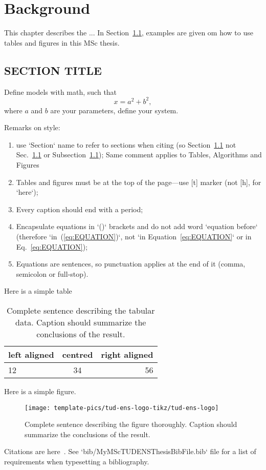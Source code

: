 \chapter{Background}
\label{chp:chapter_2}

This chapter describes the ... In Section~\ref{sec:SECTIONTITLE}, examples are given om how to use tables and figures in this MSc thesis.

\section{SECTION TITLE}
\label{sec:SECTIONTITLE}


Define models with math, such that
%
\begin{equation}
x = a^2 + b^2,
\label{eq:EQUATION}
\end{equation}
%
where $a$ and $b$ are your parameters, define your system.

Remarks on style:

\begin{enumerate}
	\item use `Section` name to refer to sections when citing (so Section~\ref{sec:SECTIONTITLE} not Sec.~\ref{sec:SECTIONTITLE} or Subsection~\ref{sec:SECTIONTITLE}); Same comment applies to Tables, Algorithms and Figures
	\item Tables and figures must be at the top of the page---use [t] marker (not [h], for `here`); 
	\item Every caption should end with a period;
	\item Encapsulate equations in `()` brackets and do not add word `equation before` (therefore `in~(\ref{eq:EQUATION})`, not `in Equation~\ref{eq:EQUATION}` or in Eq.~\ref{eq:EQUATION});
	\item Equations are sentences, so punctuation applies at the end of it (comma, semicolon or full-stop).
\end{enumerate}

Here is a simple table

\begin{table}[t]
\centering
\begin{tabular}{| l | c | r |}
\hline
left aligned & centred & right aligned \\
\hline \hline
12 & 34 & 56 \\
\hline
\end{tabular}
\caption{Complete sentence describing the tabular data. Caption should summarize the conclusions of the result.}
\label{tab:table_1}
\end{table}

Here is a simple figure.

\begin{figure}[t]
\texttt{[image: template-pics/tud-ens-logo-tikz/tud-ens-logo]}
\caption{Complete sentence describing the figure thoroughly. Caption should summarize the conclusions of the result.}
\label{fig:example-figure}
\end{figure}

Citations are here~\cite{polastre2004analysis,powercast_website,hester2016persistent,schaper_msc_thesis_2017,dementyev_uist_2016}. See `bib/MyMScTUDENSThesisBibFile.bib` file for a list of requirements when typesetting a bibliography.